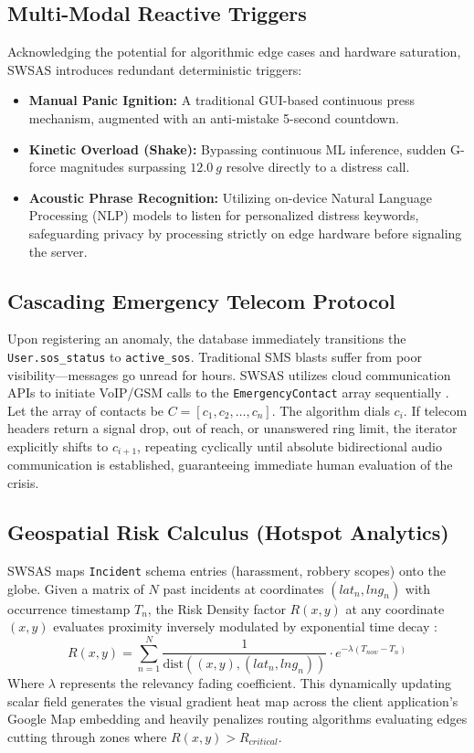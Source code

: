 \documentclass[10pt,journal,compsoc]{IEEEtran}
\begin{document}
\subsection{Multi-Modal Reactive Triggers}
Acknowledging the potential for algorithmic edge cases and hardware saturation, SWSAS introduces redundant deterministic triggers:
\begin{itemize}
    \item \textbf{Manual Panic Ignition:} A traditional GUI-based continuous press mechanism, augmented with an anti-mistake 5-second countdown.
    \item \textbf{Kinetic Overload (Shake):} Bypassing continuous ML inference, sudden G-force magnitudes surpassing $12.0\ g$ resolve directly to a distress call.
    \item \textbf{Acoustic Phrase Recognition:} Utilizing on-device Natural Language Processing (NLP) models to listen for personalized distress keywords, safeguarding privacy by processing strictly on edge hardware before signaling the server.
\end{itemize}

\subsection{Cascading Emergency Telecom Protocol}
Upon registering an anomaly, the database immediately transitions the \texttt{User.sos\_status} to \texttt{active\_sos}. Traditional SMS blasts suffer from poor visibility---messages go unread for hours. SWSAS utilizes cloud communication APIs to initiate VoIP/GSM calls to the \texttt{EmergencyContact} array sequentially \cite{souza2018}. 
Let the array of contacts be $C = [c_1, c_2, \dots, c_n]$. The algorithm dials $c_i$. If telecom headers return a signal drop, out of reach, or unanswered ring limit, the iterator explicitly shifts to $c_{i+1}$, repeating cyclically until absolute bidirectional audio communication is established, guaranteeing immediate human evaluation of the crisis.

\subsection{Geospatial Risk Calculus (Hotspot Analytics)}
SWSAS maps \texttt{Incident} schema entries (harassment, robbery scopes) onto the globe. Given a matrix of $N$ past incidents at coordinates $(lat_{n}, lng_{n})$ with occurrence timestamp $T_{n}$, the Risk Density factor $R(x,y)$ at any coordinate $(x,y)$ evaluates proximity inversely modulated by exponential time decay \cite{varma2020}:
\begin{equation}
R(x, y) = \sum_{n=1}^{N} \frac{1}{\text{dist}((x,y), (lat_n, lng_n))} \cdot e^{-\lambda (T_{now} - T_n)}
\end{equation}
Where $\lambda$ represents the relevancy fading coefficient. This dynamically updating scalar field generates the visual gradient heat map across the client application's Google Map embedding and heavily penalizes routing algorithms evaluating edges cutting through zones where $R(x,y) > R_{critical}$.
\end{document}
